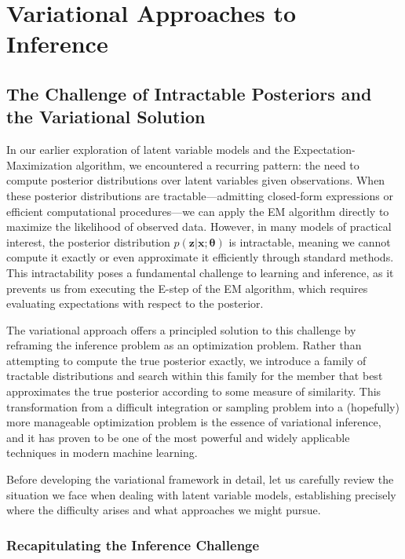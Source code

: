 \chapter{Variational Approaches to Inference}

\section*{The Challenge of Intractable Posteriors and the Variational Solution}

In our earlier exploration of latent variable models and the Expectation-Maximization algorithm, we encountered a recurring pattern: the need to compute posterior distributions over latent variables given observations. When these posterior distributions are tractable—admitting closed-form expressions or efficient computational procedures—we can apply the EM algorithm directly to maximize the likelihood of observed data. However, in many models of practical interest, the posterior distribution $p(\mathbf{z}|\mathbf{x};\boldsymbol{\theta})$ is intractable, meaning we cannot compute it exactly or even approximate it efficiently through standard methods. This intractability poses a fundamental challenge to learning and inference, as it prevents us from executing the E-step of the EM algorithm, which requires evaluating expectations with respect to the posterior.

The variational approach offers a principled solution to this challenge by reframing the inference problem as an optimization problem. Rather than attempting to compute the true posterior exactly, we introduce a family of tractable distributions and search within this family for the member that best approximates the true posterior according to some measure of similarity. This transformation from a difficult integration or sampling problem into a (hopefully) more manageable optimization problem is the essence of variational inference, and it has proven to be one of the most powerful and widely applicable techniques in modern machine learning.

Before developing the variational framework in detail, let us carefully review the situation we face when dealing with latent variable models, establishing precisely where the difficulty arises and what approaches we might pursue.

\subsection*{Recapitulating the Inference Challenge}


